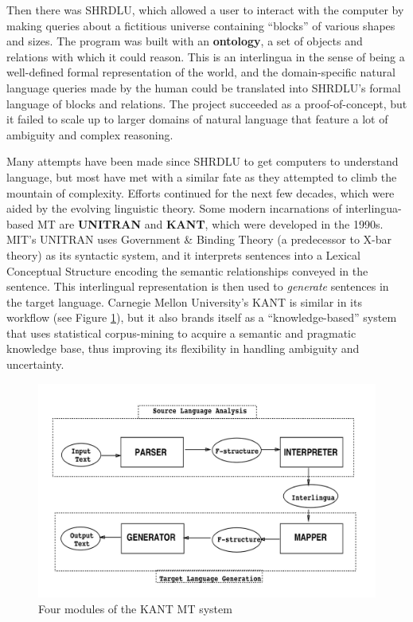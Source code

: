 \documentclass[11pt, oneside]{article}      %
\begin{document}
Then there was SHRDLU, which allowed a user to interact with the computer by making queries about a fictitious universe containing ``blocks'' of various shapes and sizes.  The program was built with an \textbf{ontology}, a set of objects and relations with which it could reason.  This is an interlingua in the sense of being a well-defined formal representation of the world, and the domain-specific natural language queries made by the human could be translated into SHRDLU's formal language of blocks and relations.  The project succeeded as a proof-of-concept, but it failed to scale up to larger domains of natural language that feature a lot of ambiguity and complex reasoning.  

Many attempts have been made since SHRDLU to get computers to understand language, but most have met with a similar fate as they attempted to climb the mountain of complexity.  Efforts continued for the next few decades, which were aided by the evolving linguistic theory.  Some modern incarnations of interlingua-based MT are \textbf{UNITRAN} and \textbf{KANT}, which were developed in the 1990s.  MIT's UNITRAN uses Government \& Binding Theory (a predecessor to X-bar theory) as its syntactic system, and it interprets sentences into a Lexical Conceptual Structure encoding the semantic relationships conveyed in the sentence.  This interlingual representation is then used to \textit{generate} sentences in the target language.  Carnegie Mellon University's KANT is similar in its workflow (see Figure \ref{kant_workflow}), but it also brands itself as a ``knowledge-based'' system that uses statistical corpus-mining to acquire a semantic and pragmatic knowledge base, thus improving its flexibility in handling ambiguity and uncertainty.  

\begin{figure}[h]
\centerline{\includegraphics[scale=1]{kant.jpg}}
\caption{Four modules of the KANT MT system} \label{kant_workflow}
\end{figure}
\end{document}
